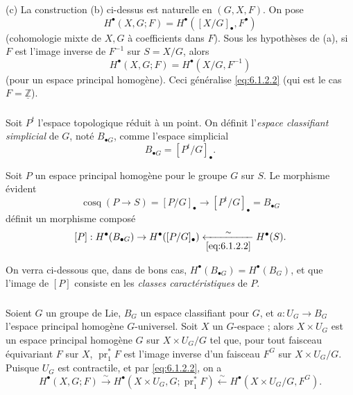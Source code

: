 \documentclass[11pt]{amsart}
\theoremstyle{plain}
\theoremstyle{definition}
\DeclareMathOperator{\cosq}{cosq}
\DeclareMathOperator{\pr}{pr}
\newcommand{\ZZ}{\mathbb{Z}}
\newcommand{\Pt}{P^t}
\begin{document}
(c) La construction (b) ci-dessus est naturelle en $(G, X, F)$. On pose
\begin{equation}\label{eq:6.1.2.3}
H^\bullet(X, G; F) = H^\bullet([X/G]_\bullet, F^\bullet)
\end{equation}
(cohomologie mixte de $X, G$ \`a coefficients dans $F$). Sous les hypoth\`eses de (a), si $F$ est l'image inverse de $F^{-1}$ sur $S = X/G$, alors
\begin{equation}\label{eq:6.1.2.4}
H^\bullet(X, G; F) = H^\bullet(X/G, F^{-1})
\end{equation}
(pour un espace principal homog\`ene). Ceci g\'en\'eralise \eqref{eq:6.1.2.2} (qui est le cas $F = \underline{\ZZ}$).

\subsubsection{}
Soit $\Pt$ l'espace topologique r\'eduit \`a un point. On d\'efinit l'\emph{espace classifiant simplicial} de $G$, not\'e $B_{\bullet G}$, comme l'espace simplicial
\[
B_{\bullet G} = [\Pt/G]_\bullet.
\]

Soit $P$ un espace principal homog\`ene pour le groupe $G$ sur $S$. Le morphisme \'evident
\[
\cosq(P \to S) = [P/G]_\bullet \to [\Pt/G]_\bullet = B_{\bullet G}
\]
d\'efinit un morphisme compos\'e
\begin{equation}\label{eq:6.1.3.1}
[P] : H^\bullet(B_{\bullet G}) \to H^\bullet([P/G]_\bullet) \xleftarrow[\eqref{eq:6.1.2.2}]{\sim} H^\bullet(S).
\end{equation}

On verra ci-dessous que, dans de bons cas, $H^\bullet(B_{\bullet G}) = H^\bullet(B_G)$, et que l'image de $[P]$ consiste en les \emph{classes caract\'eristiques} de $P$.

\subsubsection{}
Soient $G$ un groupe de Lie, $B_G$ un espace classifiant pour $G$, et $a : U_G \to B_G$ l'espace principal homog\`ene $G$-universel. Soit $X$ un $G$-espace ; alors $X \times U_G$ est un espace principal homog\`ene $G$ sur $X \times U_G/G$ tel que, pour tout faisceau \'equivariant $F$ sur $X$, $\pr_1^* F$ est l'image inverse d'un faisceau $F^G$ sur $X \times U_G/G$. Puisque $U_G$ est contractile, et par \eqref{eq:6.1.2.2}, on a
\begin{equation}\label{eq:6.1.4.1}
H^\bullet(X, G; F) \xrightarrow{\sim} H^\bullet(X \times U_G, G; \pr_1^* F) \xleftarrow{\sim} H^\bullet(X \times U_G/G, F^G).
\end{equation}
\end{document}
